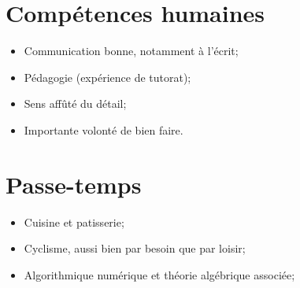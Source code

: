 \documentclass[11pt,a4paper,sans]{moderncv}
\begin{document}
\noindent
\begin{minipage}[t]{0.48\textwidth}  %
\section{Compétences humaines}
\begin{itemize}[left=0pt, label=\textbullet]
    \item Communication bonne, notamment à l'écrit;
    \item Pédagogie (expérience de tutorat);
    \item Sens affûté du détail;
    \item Importante volonté de bien faire.
\end{itemize}
\end{minipage}
\hfill
\begin{minipage}[t]{0.48\textwidth}  %
\section{Passe-temps}
\begin{itemize}[left=0pt, label=\textbullet]
    \item Cuisine et patisserie;
    \item Cyclisme, aussi bien par besoin que par loisir;
    \item Algorithmique numérique et théorie algébrique associée;
\end{itemize}
\end{minipage}
\end{document}
